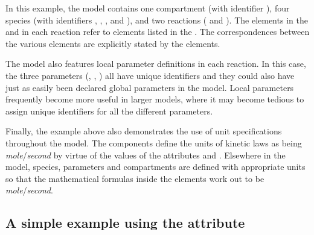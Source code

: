 
In this example, the model contains one compartment (with
identifier ), four species (with identifiers
, , , and ), and two reactions
( and ).  The elements in the
 and  in each
reaction refer to elements listed in the .
The correspondences between the various elements are explicitly
stated by the  elements.

The model also features local parameter definitions in each
reaction.  In this case, the three parameters (,
, ) all have unique identifiers and they could
also have just as easily been declared global parameters in the
model.  Local parameters frequently become more useful in larger
models, where it may become tedious to assign unique identifiers
for all the different parameters.

Finally, the example above also demonstrates the use of unit
specifications throughout the model.  The  components
define the units of kinetic laws as being
\emph{mole}/\emph{second} by virtue of the values of the
attributes  and .  Elsewhere
in the model, species, parameters and compartments are defined
with appropriate units so that the mathematical formulas inside
the  elements work out to be
\emph{mole}/\emph{second}.   


\subsection{A simple example using the  attribute}
\label{sec:eg:conversionfactor}

